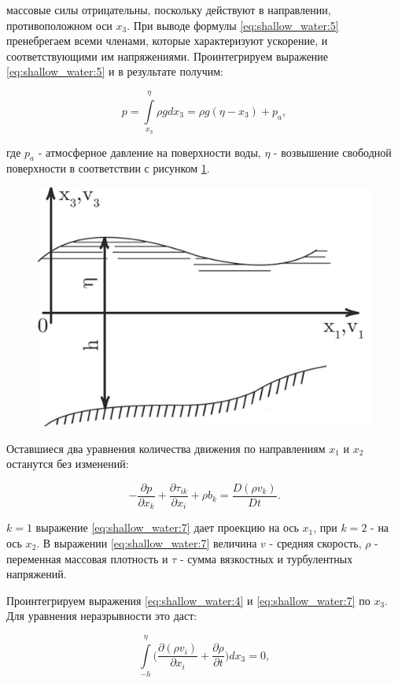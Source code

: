 \documentclass[14pt]{extreport}
\begin{document}
 массовые силы отрицательны, поскольку действуют в направлении, противоположном оси $x_3$. При выводе формулы \ref{eq:shallow_water:5} пренебрегаем всеми членами, которые характеризуют ускорение, и соответствующими им напряжениями. Проинтегрируем выражение \ref{eq:shallow_water:5} и в результате получим:

\begin{equation}\label{eq:shallow_water:6}
p = \int\limits^\eta_{x_3} \rho g dx_3 = \rho g (\eta-x_3)+p_a,
\end{equation}

\noindent где $p_a$ - атмосферное давление на поверхности воды,
$\eta$ - возвышение свободной поверхности в соответствии с рисунком \ref{img:shallow_water:1}.

\begin{figure}[H]
\centerline{\includegraphics[width=0.5\linewidth]{images/shallow_water_1}}
\caption{}
\label{img:shallow_water:1}
\end{figure}


Оставшиеся два уравнения количества движения по направлениям $x_1$ и $x_2$ останутся без изменений:

\begin{equation}\label{eq:shallow_water:7}
-\frac{\partial p}{\partial x_k} + \frac{\partial \tau_{ik}}{\partial x_i} + \rho b_k = \frac{D(\rho v_k)}{Dt}.
\end{equation}

 $k=1$ выражение \ref{eq:shallow_water:7} дает проекцию на ось $x_1$, при $k=2$ - на ось $x_2$. В выражении \ref{eq:shallow_water:7} величина $v$ - средняя скорость, $\rho$ - переменная массовая плотность и $\tau$ - сумма вязкостных и турбулентных напряжений.

Проинтегрируем выражения \ref{eq:shallow_water:4} и \ref{eq:shallow_water:7} по $x_3$. Для уравнения неразрывности это даст:

\begin{equation}\label{eq:shallow_water:8}
\int\limits^\eta_{-h} \bigg(\frac{\partial (\rho v_i)}{\partial x_i} + \frac{\partial \rho}{\partial t}\bigg) dx_3 =0,
\end{equation}
\end{document}
